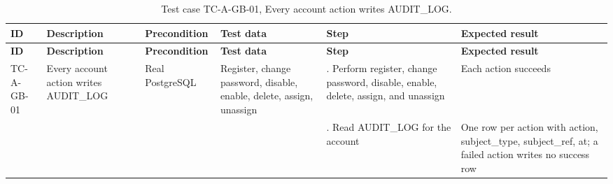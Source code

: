 {\footnotesize{}\renewcommand{\arraystretch}{1.1}
\begin{longtable}{|>{\raggedright\arraybackslash}p{}|>{\raggedright\arraybackslash}p{}|>{\raggedright\arraybackslash}p{}|>{\raggedright\arraybackslash}p{}|>{\raggedright\arraybackslash}p{}|>{\raggedright\arraybackslash}p{}|}
\caption{Test case TC-A-GB-01, Every account action writes AUDIT\_LOG.} \\
\hline
\textbf{ID} & \textbf{Description} & \textbf{Precondition} & \textbf{Test data} & \textbf{Step} & \textbf{Expected result} \\ \hline
\endfirsthead
\hline
\textbf{ID} & \textbf{Description} & \textbf{Precondition} & \textbf{Test data} & \textbf{Step} & \textbf{Expected result} \\ \hline
\endhead
TC-A-GB-01 & Every account action writes AUDIT\_LOG & Real PostgreSQL & Register, change password, disable, enable, delete, assign, unassign & 1. Perform register, change password, disable, enable, delete, assign, and unassign & Each action succeeds \\ \cline{5-6}
 &  &  &  & 2. Read AUDIT\_LOG for the account & One row per action with action, subject\_\allowbreak{}type, subject\_\allowbreak{}ref, at; a failed action writes no success row \\ \hline
\end{longtable}
}

